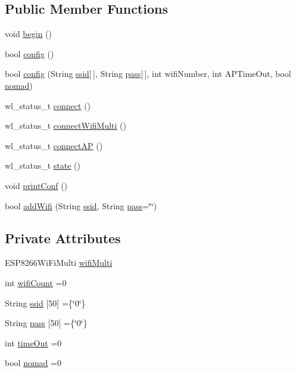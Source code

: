 \subsection*{Public Member Functions}
\begin{DoxyCompactItemize}
\item 
void \hyperlink{classCoolWifi_a46942fed90e475112cc10b78a32e7aaa}{begin} ()
\item 
bool \hyperlink{classCoolWifi_a4eb2f6b9b09dd588964b88b6c70122c0}{config} ()
\item 
bool \hyperlink{classCoolWifi_a2a9a546f76816c8c5c8e2d46a6c4f07d}{config} (String \hyperlink{classCoolWifi_a893b21d0fed821438733bba2e73fb4c2}{ssid}\mbox{[}$\,$\mbox{]}, String \hyperlink{classCoolWifi_a0c3332a149245aaad060b32593a54c9b}{pass}\mbox{[}$\,$\mbox{]}, int wifi\+Number, int A\+P\+Time\+Out, bool \hyperlink{classCoolWifi_ab7d9643c4af7bac3be331ef008b2ea27}{nomad})
\item 
wl\+\_\+status\+\_\+t \hyperlink{classCoolWifi_ad060353050f40d032a2dbf9e54a768bf}{connect} ()
\item 
wl\+\_\+status\+\_\+t \hyperlink{classCoolWifi_a419de92d738f14b7444cf822b3ab0070}{connect\+Wifi\+Multi} ()
\item 
wl\+\_\+status\+\_\+t \hyperlink{classCoolWifi_a7c857f27161782f5ef1d62d552aff971}{connect\+AP} ()
\item 
wl\+\_\+status\+\_\+t \hyperlink{classCoolWifi_a1c7b4d82a4098d346e7593dce92039fa}{state} ()
\item 
void \hyperlink{classCoolWifi_a9e6105c6d13d35ec510f6633da9e0223}{print\+Conf} ()
\item 
bool \hyperlink{classCoolWifi_a914d7a1df14dd6b75345fb614c34e9d6}{add\+Wifi} (String \hyperlink{classCoolWifi_a893b21d0fed821438733bba2e73fb4c2}{ssid}, String \hyperlink{classCoolWifi_a0c3332a149245aaad060b32593a54c9b}{pass}=\char`\"{}\char`\"{})
\end{DoxyCompactItemize}
\subsection*{Private Attributes}
\begin{DoxyCompactItemize}
\item 
E\+S\+P8266\+Wi\+Fi\+Multi \hyperlink{classCoolWifi_a7862a8c0d7239877e2956c14a368aab8}{wifi\+Multi}
\item 
int \hyperlink{classCoolWifi_ab133bd92fcb895b884deecd6678592e4}{wifi\+Count} =0
\item 
String \hyperlink{classCoolWifi_a893b21d0fed821438733bba2e73fb4c2}{ssid} \mbox{[}50\mbox{]} =\{\char`\"{}0\char`\"{}\}
\item 
String \hyperlink{classCoolWifi_a0c3332a149245aaad060b32593a54c9b}{pass} \mbox{[}50\mbox{]} =\{\char`\"{}0\char`\"{}\}
\item 
int \hyperlink{classCoolWifi_a952111605f25156588b5632caaba1c6f}{time\+Out} =0
\item 
bool \hyperlink{classCoolWifi_ab7d9643c4af7bac3be331ef008b2ea27}{nomad} =0
\end{DoxyCompactItemize}


